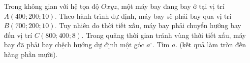 \begin{bt}%
	Trong không gian với hệ tọa độ $Oxyz$, một máy bay đang bay ở tại vị trí $A(400; 200; 10)$. Theo hành trình dự định, máy bay sẽ phải bay qua vị trí $B(700; 200; 10)$. Tuy nhiên do thời tiết xấu, máy bay phải chuyển hướng bay đến vị trí $C(800; 400; 8)$. Trong quãng thời gian tránh vùng thời tiết xấu, máy bay đã phải bay chệch hướng dự định một góc $a^{\circ}$. Tìm $a$. (kết quả làm tròn đến hàng phần mười).
\end{bt}

